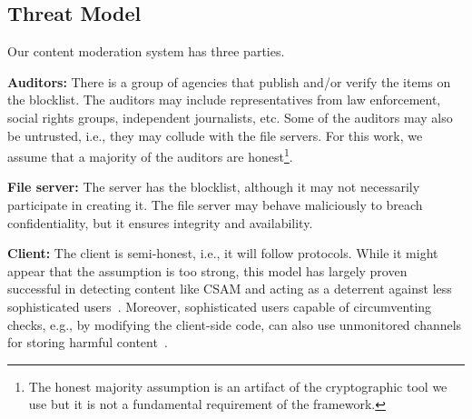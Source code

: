 \subsection{Threat Model}
%
Our content moderation system has three parties.

\enumListStart


	\item \textbf{Auditors:} There is a group of agencies that publish and/or verify the items on the blocklist. 
	The auditors may include representatives from law enforcement, social rights groups, 
	independent journalists, etc. Some of the auditors may also be untrusted, i.e., 
	they may collude with the file servers. For this work, we assume that a majority of the auditors are honest\footnote{The honest majority assumption is an artifact of the cryptographic tool we use but it is not a fundamental requirement of the framework.}.
        
	\item \textbf{File server:} The server has the blocklist, although it may not necessarily participate 
	in creating it. The file server may behave maliciously to breach confidentiality, but it ensures 
	integrity and availability. 

	\item \textbf{Client:} The client is semi-honest, i.e., it will follow protocols. While it might appear that the assumption is too strong, this model has largely proven successful in detecting content 
like CSAM and acting as a deterrent against less sophisticated users~\cite{kulshrestha2021identifying,scheffler2023public,bhowmick2021apple}. 
Moreover, sophisticated users capable of circumventing checks, e.g., by modifying the client-side code, can also use unmonitored channels for storing harmful content~\cite{kulshrestha2021identifying,scheffler2023public,bhowmick2021apple}. 

	
